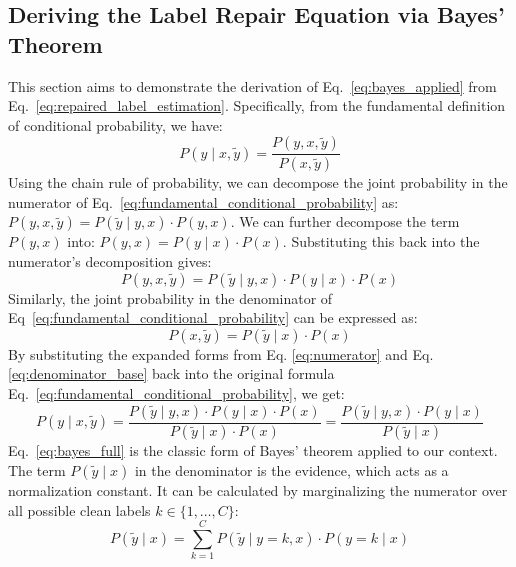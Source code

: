 
\subsection{Deriving the Label Repair Equation via Bayes' Theorem}
\label{sec:prof}

This section aims to demonstrate the derivation of Eq.~\ref{eq:bayes_applied} from Eq.~\ref{eq:repaired_label_estimation}. 
Specifically, from the fundamental definition of conditional probability, we have:
\begin{equation}
    P(y \mid x, \tilde{y}) = \frac{P(y, x, \tilde{y})}{P(x, \tilde{y})}
    \label{eq:fundamental_conditional_probability}
\end{equation}
%
%
Using the chain rule of probability, we can decompose the joint probability in the numerator of Eq.~\ref{eq:fundamental_conditional_probability} as:
    $P(y, x, \tilde{y}) = P(\tilde{y} \mid y, x) \cdot P(y, x)$. 
We can further decompose the term $P(y, x)$ into: $P(y, x) = P(y \mid x) \cdot P(x)$.
%
Substituting this back into the numerator's decomposition gives:
\begin{equation}
    P(y, x, \tilde{y}) = P(\tilde{y} \mid y, x) \cdot P(y \mid x) \cdot P(x)
    \label{eq:numerator}
\end{equation}
%
%
Similarly, the joint probability in the denominator of Eq~\ref{eq:fundamental_conditional_probability} can be expressed as:
\begin{equation}
    P(x, \tilde{y}) = P(\tilde{y} \mid x) \cdot P(x)
    \label{eq:denominator_base}
\end{equation}
By substituting the expanded forms from Eq. \ref{eq:numerator} and Eq. \ref{eq:denominator_base} back into the original formula Eq.~\ref{eq:fundamental_conditional_probability}, we get:
\begin{equation}
    P(y \mid x, \tilde{y}) = \frac{P(\tilde{y} \mid y, x) \cdot P(y \mid x) \cdot P(x)}{P(\tilde{y} \mid x) \cdot P(x)} = \frac{P(\tilde{y} \mid y, x) \cdot P(y \mid x)}{P(\tilde{y} \mid x)}
    \label{eq:bayes_full}
\end{equation}
Eq.~\ref{eq:bayes_full} is the classic form of Bayes' theorem applied to our context. The term $P(\tilde{y} \mid x)$ in the denominator is the evidence, which acts as a normalization constant. It can be calculated by marginalizing the numerator over all possible clean labels $k \in \{1, \dots, C\}$:
\begin{equation}
    P(\tilde{y} \mid x) = \sum_{k=1}^{C} P(\tilde{y} \mid y=k, x) \cdot P(y=k \mid x)
\end{equation}
